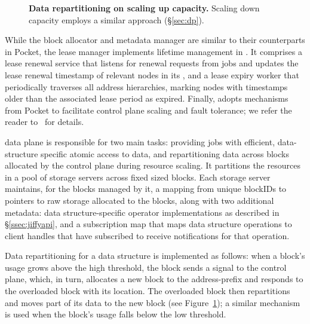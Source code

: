 \begin{figure}
  \caption[Data repartitioning on scaling up capacity]{\small\textbf{Data repartitioning on scaling up capacity.} Scaling down capacity employs a similar approach (\S\ref{sec:dp}).}\label{fig:autoscaling}
\end{figure}
%
While the block allocator and metadata manager are similar to their counterparts in Pocket, the lease manager implements lifetime management in \jiffy. It comprises a lease renewal service that listens for renewal requests from jobs and updates the lease renewal timestamp of relevant nodes in its \lh, and a lease expiry worker that periodically traverses all address hierarchies, marking nodes with timestamps older than the associated lease period as expired. Finally, \jiffy adopts mechanisms from Pocket to facilitate control plane scaling and fault tolerance; we refer the reader to~\cite{pocket} for details.

 \jiffy data plane is responsible for two main tasks: providing jobs with efficient, data-structure specific atomic access to data, and repartitioning data across blocks allocated by the control plane during resource scaling. It partitions the resources in a pool of storage servers across fixed sized blocks. Each storage server maintains, for the blocks managed by it, a mapping from unique blockIDs to pointers to raw storage allocated to the blocks, along with two additional metadata: data structure-specific operator implementations as described in \S\ref{ssec:jiffyapi}, and a subscription map that maps data structure operations to client handles that have subscribed to receive notifications for that operation. 

Data repartitioning for a \jiffy data structure is implemented as follows: when a block's usage grows above the high threshold, the block sends a signal to the control plane, which, in turn, allocates a new block to the address-prefix and responds to the overloaded block with its location. The overloaded block then repartitions and moves part of its data to the new block (see Figure~\ref{fig:autoscaling}); a similar mechanism is used when the block's usage falls below the low threshold. 

